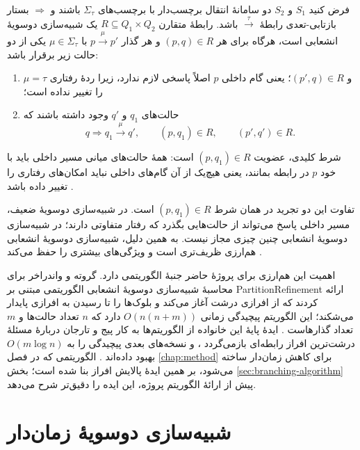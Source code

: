 \begin{definition}
\label{def:branching-bisimulation}
فرض کنید $S_1$ و $S_2$ دو سامانهٔ انتقال برچسب‌دار با برچسب‌های $\Sigma_\tau$ باشند و $\Rightarrow$ بستار بازتابی-تعدی رابطهٔ $\xrightarrow{\tau}$ باشد. رابطهٔ متقارن $R\subseteq Q_1\times Q_2$ یک شبیه‌سازی دوسویهٔ انشعابی است، هرگاه برای هر $(p,q)\in R$ و هر گذار $p\xrightarrow{\mu}p'$ با $\mu\in\Sigma_\tau$ یکی از دو حالت زیر برقرار باشد:
\begin{enumerate}
\item $\mu=\tau$ و $(p',q)\in R$؛ یعنی گام داخلی $p$ اصلاً پاسخی لازم ندارد، زیرا ردهٔ رفتاری را تغییر نداده است؛
\item حالت‌های $q_1$ و $q'$ وجود داشته باشند که
\[
q\Rightarrow q_1\xrightarrow{\mu}q',
\qquad (p,q_1)\in R,
\qquad (p',q')\in R.
\]
\end{enumerate}
شرط کلیدی، عضویت $(p,q_1)\in R$ است: همهٔ حالت‌های میانی مسیر داخلی باید با خود $p$ در رابطه بمانند، یعنی هیچ‌یک از آن گام‌های داخلی نباید امکان‌های رفتاری را تغییر داده باشد \cite{GlabbeekWeijland1996}.
\end{definition}

تفاوت این دو تجرید در همان شرط $(p,q_1)\in R$ است. در شبیه‌سازی دوسویهٔ ضعیف، مسیر داخلی پاسخ می‌تواند از حالت‌هایی بگذرد که رفتار متفاوتی دارند؛ در شبیه‌سازی دوسویهٔ انشعابی چنین چیزی مجاز نیست. به همین دلیل، شبیه‌سازی دوسویهٔ انشعابی هم‌ارزی ظریف‌تری است و ویژگی‌های بیشتری را حفظ می‌کند \cite{GlabbeekWeijland1996}.

اهمیت این هم‌ارزی برای پروژهٔ حاضر جنبهٔ الگوریتمی دارد. گروته و واندراخر برای محاسبهٔ شبیه‌سازی دوسویهٔ انشعابی الگوریتمی مبتنی بر \gls{PartitionRefinement} ارائه کردند که از افرازی درشت آغاز می‌کند و بلوک‌ها را تا رسیدن به افرازی پایدار می‌شکند؛ این الگوریتم پیچیدگی زمانی $O(n(n+m))$ دارد که $n$ تعداد حالت‌ها و $m$ تعداد گذارهاست \cite{GrooteVaandrager1990}. ایدهٔ پایهٔ این خانواده از الگوریتم‌ها به کار پیج و تارجان دربارهٔ مسئلهٔ درشت‌ترین افراز رابطه‌ای بازمی‌گردد \cite{PaigeTarjan1987}، و نسخه‌های بعدی پیچیدگی را به $O(m\log n)$ بهبود داده‌اند \cite{GrooteEtAl2017}. الگوریتمی که در فصل \ref{chap:method} برای کاهش زمان‌دار ساخته می‌شود، بر همین ایدهٔ پالایش افراز بنا شده است؛ بخش \ref{sec:branching-algorithm} پیش از ارائهٔ الگوریتم پروژه، این ایده را دقیق‌تر شرح می‌دهد.

\section{شبیه‌سازی دوسویهٔ زمان‌دار}

